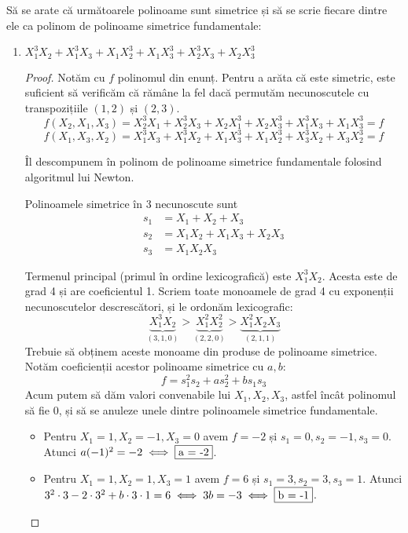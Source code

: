 \begin{exercise}[4.19]
Să se arate că următoarele polinoame sunt simetrice și să se scrie fiecare dintre ele ca polinom de polinoame simetrice fundamentale:
\begin{enumerate}
    \item \(X_1^3 X_2 + X_1^3 X_3 + X_1 X_2^3 + X_1 X_3^3 + X_2^3 X_3 + X_2 X_3^3\)
    \begin{proof}
    Notăm cu \(f\) polinomul din enunț. Pentru a arăta că este simetric, este suficient să verificăm că rămâne la fel dacă permutăm necunoscutele cu transpozițiile \((1, 2)\) și \((2, 3)\).
    \[
    f(X_2, X_1, X_3) = X_2^3 X_1 + X_2^3 X_3 + X_2 X_1^3 + X_2 X_3^3 + X_1^3 X_3 + X_1 X_3^3 = f
    \]
    \[
    f(X_1, X_3, X_2) = X_1^3 X_3 + X_1^3 X_2 + X_1 X_3^3 + X_1 X_2^3 + X_3^3 X_2 + X_3 X_2^3 = f
    \]

    Îl descompunem în polinom de polinoame simetrice fundamentale folosind algoritmul lui Newton.
    
    Polinoamele simetrice în 3 necunoscute sunt
    \begin{align*}
        s_1 &= X_1 + X_2 + X_3 \\
        s_2 &= X_1 X_2 + X_1 X_3 + X_2 X_3 \\
        s_3 &= X_1 X_2 X_3
    \end{align*}
    
    Termenul principal (primul în ordine lexicografică) este \(X_1^3 X_2\). Acesta este de grad 4 și are coeficientul 1. Scriem toate monoamele de grad 4 cu exponenții necunoscutelor descrescători, și le ordonăm lexicografic:
    \[
    \underbrace{X_1^3 X_2}_{(3, 1, 0)} > \underbrace{X_1^2 X_2^2}_{(2, 2, 0)} > \underbrace{X_1^2 X_2 X_3}_{(2, 1, 1)}
    \]
    Trebuie să obținem aceste monoame din produse de polinoame simetrice. Notăm coeficienții acestor polinoame simetrice cu \(a, b\):
    \[
        f = s_1^2 s_2 + a s_2^2 + b s_1 s_3
    \]
    Acum putem să dăm valori convenabile lui \(X_1, X_2, X_3\), astfel încât polinomul să fie 0, și să se anuleze unele dintre polinoamele simetrice fundamentale.
    
    \begin{itemize}
        \item Pentru \(X_1 = 1, X_2 = -1, X_3 = 0\) avem \(f = -2\) și \(s_1 = 0, s_2 = -1, s_3 = 0\).
        Atunci \(a (-1)^2 = -2 \iff \fbox{a = -2}\).
        \item Pentru \(X_1 = 1, X_2 = 1, X_3 = 1\) avem \(f = 6\) și \(s_1 = 3, s_2 = 3, s_3 = 1\).
        Atunci \(3^2 \cdot 3 - 2 \cdot 3^2 + b \cdot 3 \cdot 1 = 6 \iff 3b = -3 \iff \fbox{b = -1}\).
    \end{itemize}
    

\end{proof}
\end{enumerate}
\end{exercise}
